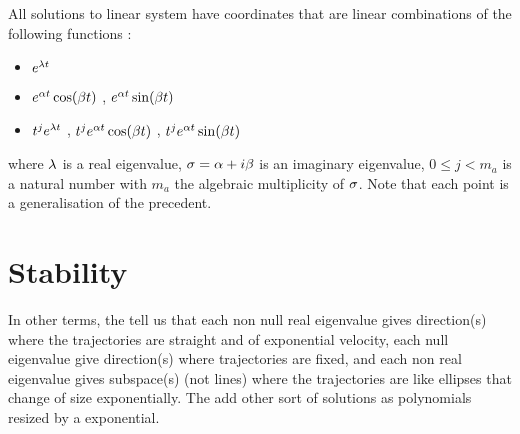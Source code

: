 \begin{corollaire} \label{cor:formesolutionlineaire}
    All solutions to linear system have coordinates that are linear combinations of the following functions :
    \begin{itemize}
    \item $e^{\lambda t}$ 
    \item $e^{\alpha t}\cos(\beta t)$ , $e^{\alpha t}\sin(\beta t)$
    \item $t^je^{\lambda t}$ , $t^je^{\alpha t}\cos(\beta t)$ , $t^je^{\alpha t}\sin(\beta t)$ 
    \end{itemize}
    where $\lambda$ is a real eigenvalue, $\sigma=\alpha+i\beta$ is an imaginary eigenvalue, $0\leq j< m_a$ is a natural number with $m_a$ the algebraic multiplicity of $\sigma$. Note that each point is a generalisation of the precedent.
\end{corollaire}

\section{Stability}
In other terms, the  tell us that each non null real eigenvalue gives direction(s) where the trajectories are straight and of exponential velocity, each null eigenvalue give direction(s) where trajectories are fixed, and each non real eigenvalue gives subspace(s) (not lines) where the trajectories are like ellipses that change of size exponentially. The  add other sort of solutions as polynomials resized by a exponential.

